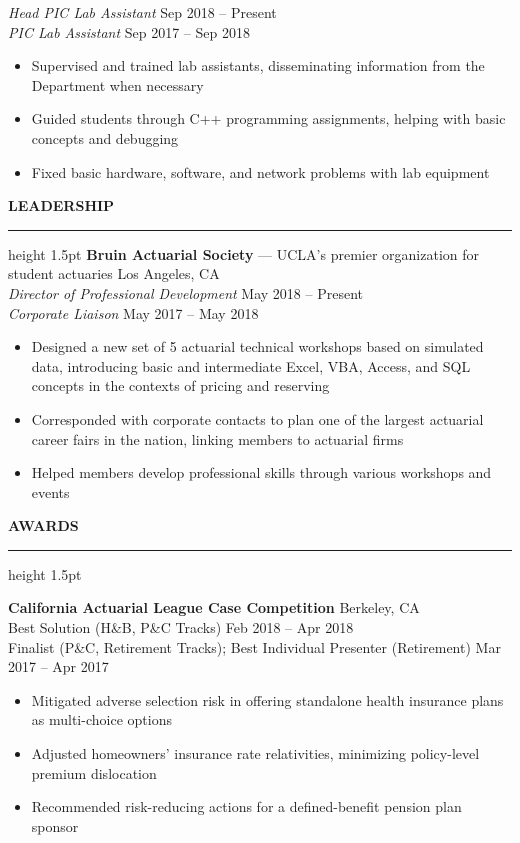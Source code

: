 \documentclass[11pt,letterpaper]{article}
\newcommand{\sectline}{\vspace{4pt}\hrule height 1.5pt\vspace{4pt}}
\newcommand{\sectspace}{\vspace{8pt}}
\begin{document}
\textit{Head PIC Lab Assistant} \hfill Sep 2018 -- Present \\
\textit{PIC Lab Assistant} \hfill Sep 2017 -- Sep 2018
\begin{itemize}
	\item Supervised and trained lab assistants, disseminating information from the Department when necessary
	\item Guided students through C++ programming assignments, helping with basic concepts and debugging
	\item Fixed basic hardware, software, and network problems with lab equipment
\end{itemize}
\sectspace


\textbf{LEADERSHIP} \sectline
\textbf{Bruin Actuarial Society} --- UCLA's premier organization for student actuaries \hfill Los Angeles, CA \\
\textit{Director of Professional Development} \hfill May 2018 -- Present \\
\textit{Corporate Liaison} \hfill May 2017 -- May 2018
\begin{itemize}
	\item Designed a new set of 5 actuarial technical workshops based on simulated data, introducing basic and intermediate Excel, VBA, Access, and SQL concepts in the contexts of pricing and reserving
	\item Corresponded with corporate contacts to plan one of the largest actuarial career fairs in the nation, linking members to actuarial firms
	\item Helped members develop professional skills through various workshops and events
\end{itemize}
\sectspace

\textbf{AWARDS} \sectline

\textbf{California Actuarial League Case Competition} \hfill Berkeley, CA \\
Best Solution (H\&B, P\&C Tracks) \hfill Feb 2018 -- Apr 2018 \\
Finalist (P\&C, Retirement Tracks); Best Individual Presenter (Retirement) \hfill Mar 2017 -- Apr 2017 
\begin{itemize}
	\item Mitigated adverse selection risk in offering standalone health insurance plans as multi-choice options
	\item Adjusted homeowners' insurance rate relativities, minimizing policy-level premium dislocation 
	\item Recommended risk-reducing actions for a defined-benefit pension plan sponsor
\end{itemize}
\end{document}
